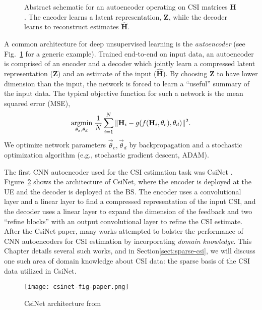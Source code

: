 \begin{figure}[!hbtp]
\centering
\def\svgwidth{0.8\columnwidth}

\caption{Abstract schematic for an autoencoder operating on CSI matrices $\mathbf H$. The encoder learns a latent representation, $\mathbf Z$, while the decoder learns to reconstruct estimates $\hat{\mathbf H}$.}
\label{fig:autoencoder_schematic}
\end{figure}

A common architecture for deep unsupervised learning is the \emph{autoencoder} (see Fig.~\ref{fig:autoencoder_schematic} for a generic example). Trained end-to-end on input data, an autoencoder is comprised of an encoder and a decoder which jointly learn a compressed latent representation ($\mathbf Z$) and an estimate of the input ($\hat{\mathbf H}$). By choosing $\mathbf Z$ to have lower dimension than the input, the network is forced to learn a ``useful'' summary of the input data. The typical objective function for such a network is the mean squared error (MSE),
\begin{align*}
\underset{\theta_e, \theta_d}{\text{argmin}}\; \frac 1N \sum_{i=1}^N\Arrowvert \mathbf H_i - g(f(\mathbf H_i, \theta_e), \theta_d) \Arrowvert^2.
\end{align*}
We optimize network parameters $\vec \theta_e, \vec \theta_d$ by backpropagation and a stochastic optimization algorithm (e.g., stochastic gradient descent, ADAM).

The first CNN autoencoder used for the CSI estimation task was CsiNet \cite{ref:csinet}. Figure~\ref{fig:csinet} shows the architecture of CsiNet, where the encoder is deployed at the UE and the decoder is deployed at the BS. The encoder uses a convolutional layer and a linear layer to find a compressed representation of the input CSI, and the decoder uses a linear layer to expand the dimension of the feedback and two ``refine blocks'' with an output convolutional layer to refine the CSI estimate. After the CsiNet paper, many works attempted to bolster the performance of CNN autoencoders for CSI estimation by incorporating \emph{domain knowledge}. This Chapter details several such works, and in Section\ref{sect:sparse-csi}, we will discuss one such area of domain knowledge about CSI data: the sparse basis of the CSI data utilized in CsiNet. 

\begin{figure}[htb]
	\centering
	\texttt{[image: csinet-fig-paper.png]}
	\caption{CsiNet architecture from \cite{ref:csinet}}
	\label{fig:csinet}
\end{figure}

